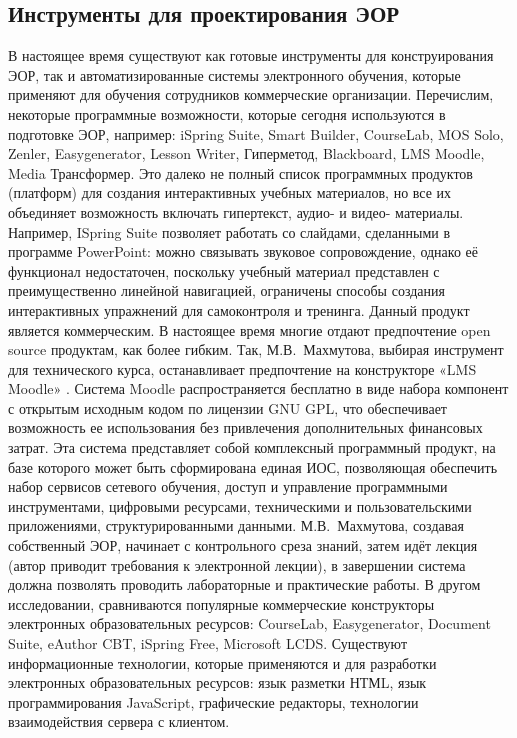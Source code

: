 \large
\subsection{Инструменты для проектирования ЭОР}

В настоящее время существуют как готовые инструменты для конструирования ЭОР, так и автоматизированные системы электронного обучения, которые применяют для обучения сотрудников коммерческие организации.
Перечислим, некоторые программные возможности, которые сегодня используются в подготовке ЭОР, например: iSpring Suite, Smart Builder, CourseLab, MOS Solo, Zenler, Easygenerator, Lesson Writer, Гиперметод, Blackboard, LMS Moodle, Media Трансформер.
Это далеко не полный список программных продуктов (платформ) для создания интерактивных учебных материалов, но все их объединяет возможность включать гипертекст, аудио- и видео- материалы. Например, ISpring Suite позволяет работать со слайдами, сделанными в программе PowerPoint: можно связывать звуковое сопровождение, однако её функционал недостаточен, поскольку учебный материал представлен с преимущественно линейной навигацией, ограничены способы создания интерактивных упражнений для самоконтроля и тренинга. Данный продукт является коммерческим. В настоящее время многие отдают предпочтение open source продуктам, как более гибким. Так, М.В.~Махмутова, выбирая инструмент для технического курса, останавливает предпочтение на конструкторе «LMS Moodle» \cite{mahmutova19, larin}. 
Система Moodle распространяется бесплатно в виде набора компонент с открытым исходным кодом по лицензии GNU GPL, что обеспечивает возможность ее использования без привлечения дополнительных финансовых затрат. Эта система представляет собой комплексный программный продукт, на базе которого может быть сформирована единая ИОС, позволяющая обеспечить набор сервисов сетевого обучения, доступ и управление программными инструментами, цифровыми ресурсами, техническими и пользовательскими приложениями, структурированными данными. М.В.~Махмутова, создавая собственный ЭОР, начинает с контрольного среза знаний, затем идёт лекция (автор приводит требования к электронной лекции), в завершении система должна позволять проводить лабораторные и практические работы.
В другом исследовании, сравниваются популярные коммерческие конструкторы электронных образовательных ресурсов: CourseLab, Easygenerator, Document Suite, eAuthor CBT, iSpring Free, Microsoft LCDS.
Существуют информационные технологии, которые применяются и для разработки электронных образовательных ресурсов: язык разметки НТМL, язык программирования JavaScript, графические редакторы, технологии взаимодействия сервера с клиентом\cite[С. 154.]{dementeva17}.
